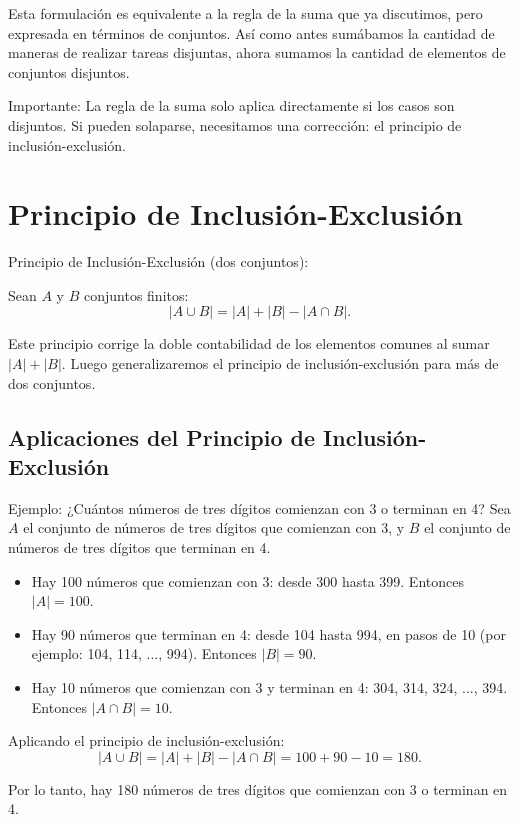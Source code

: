 Esta formulación es equivalente a la regla de la suma que ya discutimos, pero expresada en términos de conjuntos. Así como antes sumábamos la cantidad de maneras de realizar tareas disjuntas, ahora sumamos la cantidad de elementos de conjuntos disjuntos.


\begin{definitionblock}{Importante:} La regla de la suma solo aplica directamente si los casos son disjuntos. Si pueden solaparse, necesitamos una corrección: el principio de inclusión-exclusión.
\end{definitionblock}


\section{Principio de Inclusión-Exclusión}

\begin{thmblock}{Principio de Inclusión-Exclusión (dos conjuntos):}

Sean $A$ y $B$ conjuntos finitos:
\[
|A \cup B| = |A| + |B| - |A \cap B|.
\]
\end{thmblock}

Este principio corrige la doble contabilidad de los elementos comunes al sumar $|A| + |B|$. 
Luego generalizaremos el principio de inclusión-exclusión para más de dos
conjuntos. 

\subsection{Aplicaciones del Principio de Inclusión-Exclusión}

\begin{exampleblock}{Ejemplo: ¿Cuántos números de tres dígitos comienzan con 3 o terminan en 4?}
Sea $A$ el conjunto de números de tres dígitos que comienzan con 3, y $B$ el conjunto de números de tres dígitos que terminan en 4.

\begin{itemize}
  \item Hay 100 números que comienzan con 3: desde 300 hasta 399. Entonces $|A| = 100$.
  \item Hay 90 números que terminan en 4: desde 104 hasta 994, en pasos de 10 (por ejemplo: 104, 114, ..., 994). Entonces $|B| = 90$.
  \item Hay 10 números que comienzan con 3 y terminan en 4: 304, 314, 324, ..., 394. Entonces $|A \cap B| = 10$.
\end{itemize}

Aplicando el principio de inclusión-exclusión:
\[
|A \cup B| = |A| + |B| - |A \cap B| = 100 + 90 - 10 = 180.
\]

Por lo tanto, hay 180 números de tres dígitos que comienzan con 3 o terminan en 4.
\end{exampleblock}

